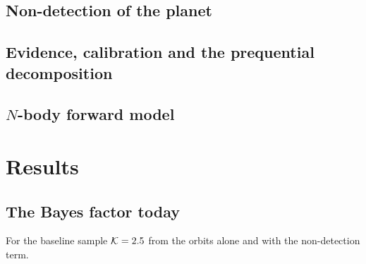 \documentclass[twocolumn,linenumbers]{aastex631}
\newcommand{\Kbf}{\mathcal{K}}
\begin{document}
\subsection{Non-detection of the planet}\label{sec:nondet}

\subsection{Evidence, calibration and the prequential decomposition}\label{sec:prequential}

\subsection{$N$-body forward model}\label{sec:nbody}

\section{Results}\label{sec:results}

\subsection{The Bayes factor today}\label{sec:bf}
For the baseline sample $\Kbf=\KbbOrbits$ from the orbits alone and \KbbNondet{} with the non-detection term.
\end{document}

